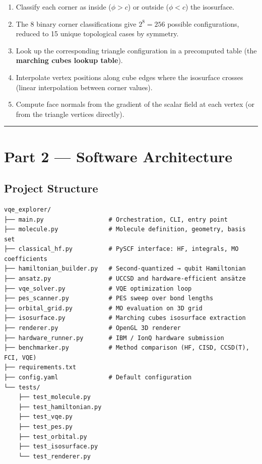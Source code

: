 \documentclass[
  11pt,
]{report}
\providecommand{\tightlist}{%
  \setlength{\itemsep}{0pt}\setlength{\parskip}{0pt}}
\begin{document}
\begin{enumerate}
\def\labelenumi{\arabic{enumi}.}
\tightlist
\item
  Classify each corner as inside (\(\phi > c\)) or outside
  (\(\phi < c\)) the isosurface.
\item
  The 8 binary corner classifications give \(2^8 = 256\) possible
  configurations, reduced to 15 unique topological cases by symmetry.
\item
  Look up the corresponding triangle configuration in a precomputed
  table (the \textbf{marching cubes lookup table}).
\item
  Interpolate vertex positions along cube edges where the isosurface
  crosses (linear interpolation between corner values).
\item
  Compute face normals from the gradient of the scalar field at each
  vertex (or from the triangle vertices directly).
\end{enumerate}

\begin{center}\rule{0.5\linewidth}{0.5pt}\end{center}

\section{Part 2 --- Software
Architecture}\label{part-2-software-architecture}

\subsection{Project Structure}\label{project-structure}

\begin{verbatim}
vqe_explorer/
├── main.py                  # Orchestration, CLI, entry point
├── molecule.py              # Molecule definition, geometry, basis set
├── classical_hf.py          # PySCF interface: HF, integrals, MO coefficients
├── hamiltonian_builder.py   # Second-quantized → qubit Hamiltonian
├── ansatz.py                # UCCSD and hardware-efficient ansätze
├── vqe_solver.py            # VQE optimization loop
├── pes_scanner.py           # PES sweep over bond lengths
├── orbital_grid.py          # MO evaluation on 3D grid
├── isosurface.py            # Marching cubes isosurface extraction
├── renderer.py              # OpenGL 3D renderer
├── hardware_runner.py       # IBM / IonQ hardware submission
├── benchmarker.py           # Method comparison (HF, CISD, CCSD(T), FCI, VQE)
├── requirements.txt
├── config.yaml              # Default configuration
└── tests/
    ├── test_molecule.py
    ├── test_hamiltonian.py
    ├── test_vqe.py
    ├── test_pes.py
    ├── test_orbital.py
    ├── test_isosurface.py
    └── test_renderer.py
\end{verbatim}
\end{document}
